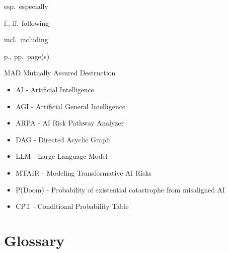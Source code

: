 \documentclass[
  11pt,
  letterpaper,
]{book}
\providecommand{\tightlist}{%
  \setlength{\itemsep}{0pt}\setlength{\parskip}{0pt}}
\begin{document}

esp.~especially

f., ff.~following

incl.~including

p., pp.~page(s)

MAD Mutually Assured Destruction

\begin{itemize}
\tightlist
\item
  AI - Artificial Intelligence\\
\item
  AGI - Artificial General Intelligence\\
\item
  ARPA - AI Risk Pathway Analyzer\\
\item
  DAG - Directed Acyclic Graph\\
\item
  LLM - Large Language Model\\
\item
  MTAIR - Modeling Transformative AI Risks\\
\item
  P(Doom) - Probability of existential catastrophe from misaligned AI\\
\item
  CPT - Conditional Probability Table
\end{itemize}

\section*{Glossary}\label{glossary}

\end{document}

